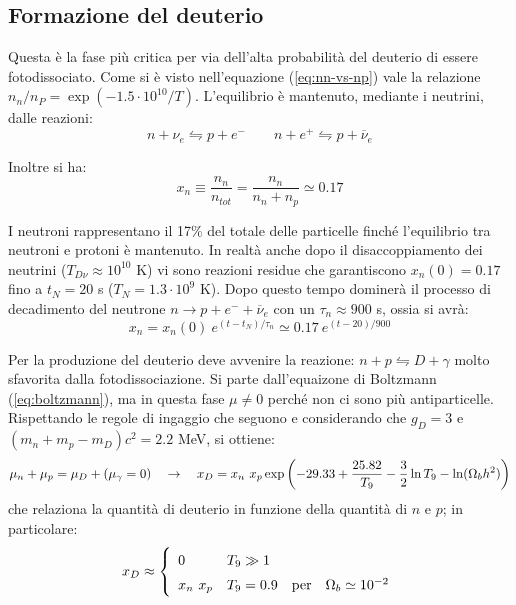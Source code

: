 \subsection{Formazione del deuterio}
Questa è la fase più critica per via dell'alta probabilità del deuterio di essere fotodissociato. Come si è visto nell'equazione (\ref{eq:nn-vs-np}) vale la relazione $n_n / n_P = \exp{(-1.5\cdot 10^{10}/T)}$. L'equilibrio è mantenuto, mediante i neutrini, dalle reazioni:
$$
n + \nu_e \leftrightharpoons p + e^- \qquad n+e^+ \leftrightharpoons p + {\overbar{\nu}_e}
$$

Inoltre si ha:
$$
x_n \equiv \frac{n_n}{n_{tot}} = \frac{n_n}{n_n + n_p} \simeq 0.17
$$

I neutroni rappresentano il 17\% del totale delle particelle finché l'equilibrio tra neutroni e protoni è mantenuto. In realtà anche dopo il disaccoppiamento dei neutrini ($T_{D\nu}\approx 10^{10}$ K) vi sono reazioni residue che garantiscono $x_n (0)=0.17$ fino a $t_N=20$ s ($T_N=1.3 \cdot 10^{9}$ K). Dopo questo tempo dominerà il processo di decadimento del neutrone $ n \rightarrow p + e^- + {\overbar{\nu}_e}$ con un $\tau_n \approx 900$ s, ossia si avrà:
\begin{equation*}
    x_n = x_n (0)~ e^{(t-t_N) / \tau_n}\simeq 0.17 ~e^{(t-20)/ 900}
\end{equation*}

 Per la produzione del deuterio deve avvenire la reazione: $n+p \leftrightharpoons D + \gamma$ molto sfavorita dalla fotodissociazione. Si parte dall'equaizone di Boltzmann (\ref{eq:boltzmann}), ma in questa fase $\mu\neq 0$ perché non ci sono più antiparticelle. Rispettando le regole di ingaggio che seguono e considerando che $g_D=3$ e $(m_n+m_p-m_D)c^2=2.2$ MeV, si ottiene:
\begin{equation*}
    \mu_n + \mu_p = \mu_D +  (\mu_\gamma =0) \quad \rightarrow \quad x_D=x_n ~x_p \exp{\left(-29.33+\frac{25.82}{T_9} -\frac{3}{2}\ln T_9 - \ln (\Omega_{b}h^2) \right)} 
\end{equation*}
che relaziona la quantità di deuterio in funzione della quantità di $n$ e $p$; in particolare:
\begin{equation}x_D \approx \left\{
    \def\arraystretch{1.5}
        \begin{array}{ll}
            0 & T_9 \gg 1 \\ 
            x_n ~x_p & T_9 = 0.9 \quad\mathrm{per}\quad \Omegab \simeq 10^{-2}
    \end{array}\right. \label{eq:xdeuterio}
\end{equation}

